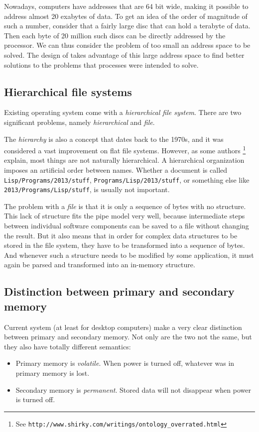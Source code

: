 Nowadays, computers have addresses that are 64 bit wide, making it
possible to address almost 20 exabytes of data.  To get an idea of the
order of magnitude of such a number, consider that a fairly large disc
that can hold a terabyte of data.  Then each byte of 20 million such
discs can be directly addressed by the processor.  We can thus
consider the problem of too small an address space to be solved.  The
design of \sysname{} takes advantage of this large address space to
find better solutions to the problems that processes were intended to
solve.

\subsection{Hierarchical file systems}

Existing operating system come with a \emph{hierarchical file
system}.  There are two significant problems,
namely \emph{hierarchical} and \emph{file}.

The \emph{ hierarchy} is also a concept that dates back to the
1970s, and it was considered a vast improvement on flat file
systems.  However, as some authors%
\footnote{See
  \texttt{http://www.shirky.com/writings/ontology\_overrated.html}}
explain, most things are not naturally hierarchical.  A hierarchical
organization imposes an artificial order between names.  Whether a
document is called \texttt{Lisp/Programs/2013/stuff},
\texttt{Programs/Lisp/2013/stuff}, or something else like
\texttt{2013/Programs/Lisp/stuff}, is usually not important.

The problem with a \emph{file} is that it is only a sequence of
bytes with no structure.  This lack of structure fits the \unix{} pipe
model very well, because intermediate steps between individual
software components can be saved to a file without changing the
result.  But it also means that in order for complex data structures
to be stored in the file system, they have to be transformed into a
sequence of bytes.  And whenever such a structure needs to be
modified by some application, it must again be parsed and
transformed into an in-memory structure.

\subsection{Distinction between primary and secondary memory}

Current system (at least for desktop computers) make a very clear
distinction between primary and secondary memory.  Not only are the
two not the same, but they also have totally different semantics:
\begin{itemize}
\item Primary memory is \emph{volatile}.  When power is turned off,
    whatever was in primary memory is lost.
    \item Secondary memory is \emph{permanent}.  Stored data will not
    disappear when power is turned off.
\end{itemize}

